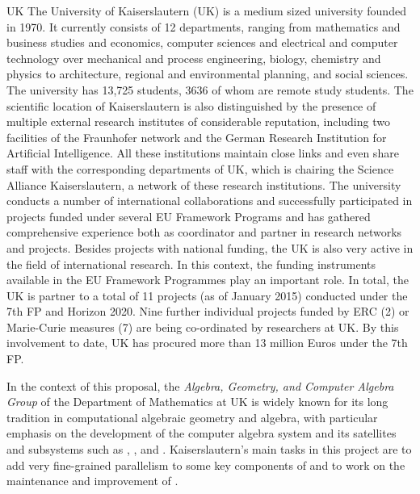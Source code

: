 \begin{sitedescription}{UK}
The University of Kaiserslautern (UK) is a medium sized university founded in 1970. It currently 
consists of 12 departments, ranging from mathematics and business studies and economics, 
computer sciences and electrical and computer technology over mechanical and process engineering, 
biology, chemistry and physics to architecture, regional and environmental planning, and social sciences. 
The university has 13,725 students, 3636 of whom are remote study students. The scientific location 
of Kaiserslautern is also distinguished by the presence of multiple external research institutes of 
considerable reputation, including two facilities of the Fraunhofer network and the German Research 
Institution for Artificial Intelligence. All these institutions maintain close links and even share staff 
with the corresponding departments of UK, which is chairing the Science Alliance Kaiserslautern, 
a network of these research institutions. The university conducts a number of international 
collaborations and successfully participated in projects funded under several EU Framework 
Programs and has gathered comprehensive experience both as coordinator and partner in research 
networks and projects. Besides projects with national funding, the UK is 
also very active in the field of international research. In this context, the funding instruments 
available in the EU Framework Programmes play an important role. In total, the UK is partner 
to a total of 11 projects (as of January 2015) conducted under the 7th FP and Horizon 2020. 
Nine further individual projects funded by ERC (2) or Marie-Curie measures (7) are being co-ordinated 
by researchers at UK. By this involvement to date, UK has procured more than 13 million Euros under the 7th FP.

\medskip In the context of this proposal, the
\emph{Algebra, Geometry, and Computer Algebra Group}  of the Department
of Mathematics at UK is widely known for its long tradition in 
computational algebraic geometry and algebra, with particular emphasis on the 
development of the computer algebra system \Singular and its satellites and  
subsystems such as , , and .
Kaiserslautern's main tasks in this project are to add very fine-grained 
parallelism to some key components of \Singular and to work
on the maintenance and improvement of \MPIR.


\end{sitedescription}
